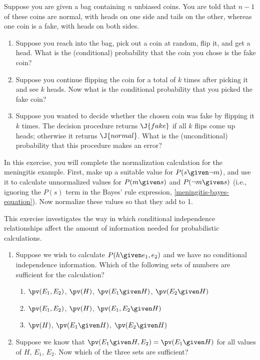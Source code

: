 \begin{uexercise}
Suppose you are given a bag containing \(n\) unbiased coins.
You are told that \(n-1\) of these coins are normal, with heads on
one side and tails on the other, whereas one coin is a fake, with 
heads on both sides.
\begin{enumerate}
\item Suppose you reach into the bag, pick out a coin at random,
flip it, and get a head.  What is the (conditional)
probability that the coin you chose is the fake coin?

\item Suppose you continue flipping the coin for a total of \(k\) times after picking it
and see \(k\) heads. Now what is the conditional probability
that you picked the fake coin?

\item Suppose you wanted to decide whether the chosen coin was fake
by flipping it \(k\) times. The decision procedure returns \(\J{fake}\)
if all \(k\) flips come up heads; otherwise it returns \(\J{normal}\).
What is the (unconditional) probability that this procedure
makes an error?
\end{enumerate}
\end{uexercise} 

\begin{exercise}%
In this exercise, you will complete the normalization calculation for
the meningitis example. First, make up a suitable value for 
\(P(s\given\lnot m)\), and use it to calculate unnormalized values for
\(P(m\given s)\) and \(P(\lnot m \given s)\) (i.e., ignoring the \(P(s)\) term 
in the Bayes' rule expression, \eqref{meningitis-bayes-equation}). Now normalize these values
so that they add to 1.
\end{exercise} 

\begin{iexercise}
This exercise investigates the way in which conditional independence
relationships affect the amount of information needed for
probabilistic calculations.
\begin{enumerate}
\item Suppose we wish to calculate \(P(h\given e_1,e_2)\) and we have
no conditional independence information. Which of the following sets
of numbers are sufficient for the calculation? 
\begin{enumerate}
\item \(\pv(E_1,E_2)\), \(\pv(H)\), \(\pv(E_1\given H)\), \(\pv(E_2\given H)\)
\item \(\pv(E_1,E_2)\), \(\pv(H)\), \(\pv(E_1,E_2\given H)\)
\item \(\pv(H)\), \(\pv(E_1\given H)\), \(\pv(E_2\given H)\)
\end{enumerate}
\item Suppose we know that \(\pv(E_1\given H,E_2)=\pv(E_1\given H)\) for all values of
\(H\), \(E_1\), \(E_2\). Now which of the  three sets are sufficient?
\end{enumerate}
\end{iexercise} 

